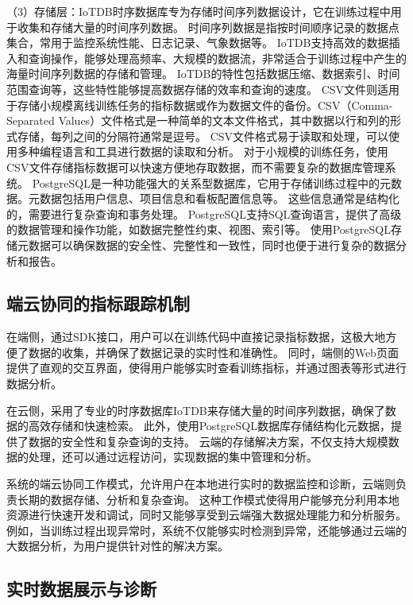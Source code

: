（3）存储层：IoTDB时序数据库\cite{Wan23}专为存储时间序列数据设计，它在训练过程中用于收集和存储大量的时间序列数据。
时间序列数据是指按时间顺序记录的数据点集合，常用于监控系统性能、日志记录、气象数据等。
IoTDB支持高效的数据插入和查询操作，能够处理高频率、大规模的数据流，非常适合于训练过程中产生的海量时间序列数据的存储和管理。
IoTDB的特性包括数据压缩、数据索引、时间范围查询等，这些特性能够提高数据存储的效率和查询的速度。
CSV文件则适用于存储小规模离线训练任务的指标数据或作为数据文件的备份。CSV（Comma-Separated Values）文件格式是一种简单的文本文件格式，其中数据以行和列的形式存储，每列之间的分隔符通常是逗号。
CSV文件格式易于读取和处理，可以使用多种编程语言和工具进行数据的读取和分析。
对于小规模的训练任务，使用CSV文件存储指标数据可以快速方便地存取数据，而不需要复杂的数据库管理系统。
PostgreSQL是一种功能强大的关系型数据库，它用于存储训练过程中的元数据。元数据包括用户信息、项目信息和看板配置信息等。
这些信息通常是结构化的，需要进行复杂查询和事务处理。
PostgreSQL支持SQL查询语言，提供了高级的数据管理和操作功能，如数据完整性约束、视图、索引等。
使用PostgreSQL存储元数据可以确保数据的安全性、完整性和一致性，同时也便于进行复杂的数据分析和报告。

\subsection{端云协同的指标跟踪机制}

在端侧，通过SDK接口，用户可以在训练代码中直接记录指标数据，这极大地方便了数据的收集，并确保了数据记录的实时性和准确性。
同时，端侧的Web页面提供了直观的交互界面，使得用户能够实时查看训练指标，并通过图表等形式进行数据分析。

在云侧，采用了专业的时序数据库IoTDB来存储大量的时间序列数据，确保了数据的高效存储和快速检索。
此外，使用PostgreSQL数据库存储结构化元数据，提供了数据的安全性和复杂查询的支持。
云端的存储解决方案，不仅支持大规模数据的处理，还可以通过远程访问，实现数据的集中管理和分析。

系统的端云协同工作模式，允许用户在本地进行实时的数据监控和诊断，云端则负责长期的数据存储、分析和复杂查询。
这种工作模式使得用户能够充分利用本地资源进行快速开发和调试，同时又能够享受到云端强大数据处理能力和分析服务。
例如，当训练过程出现异常时，系统不仅能够实时检测到异常，还能够通过云端的大数据分析，为用户提供针对性的解决方案。

\subsection{实时数据展示与诊断}

